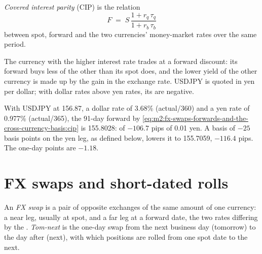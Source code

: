 \begin{definition}\label{def:m2:fx-swaps-forwards-and-the-cross-currency-basis:cip}
\emph{Covered interest parity} (CIP) is the
relation
\begin{equation}\label{eq:m2:fx-swaps-forwards-and-the-cross-currency-basis:cip}
F \;=\; S\,\frac{1 + r_q\,\tau_q}{1 + r_b\,\tau_b}
\end{equation}
between spot, forward and the two currencies' money-market rates over the same
period.
\end{definition}

The currency with the higher interest rate trades at a forward discount: its
forward buys less of the other than its spot does, and the lower yield of the
other currency is made up by the gain in the exchange rate. USDJPY is quoted in
yen per dollar; with dollar rates above yen rates, its  are
negative.

\begin{example}\label{ex:m2:fx-swaps-forwards-and-the-cross-currency-basis:fwd}
With USDJPY at 156.87, a dollar rate of 3.68\% (actual/360) and a yen rate of
0.977\% (actual/365), the 91-day forward by \cref{eq:m2:fx-swaps-forwards-and-the-cross-currency-basis:cip}
is 155.8028:  of $-106.7$ pips of 0.01 yen. A basis of $-25$ basis
points on the yen leg, as defined below, lowers it to 155.7059, $-116.4$ pips.
The one-day  points are $-1.18$.
\end{example}

\section{FX swaps and short-dated rolls}

\begin{definition}\label{def:m2:fx-swaps-forwards-and-the-cross-currency-basis:swap}
An \emph{FX swap} is a pair of opposite exchanges of the same
amount of one currency: a near leg, usually at spot, and a far leg at a forward
date, the two rates differing by the . \emph{Tom-next}
is the one-day swap from the next business day (tomorrow) to the day after
(next), with which positions are rolled from one spot date to the next.
\end{definition}


